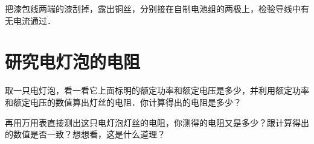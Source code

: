 把漆包线两端的漆刮掉，露出铜丝，分别接在自制电池组的两极上，检验导线中有无电流通过．

\section{研究电灯泡的电阻}
取一只电灯泡，看一看它上面标明的额定功率和额定电压是多少，并利用额定功率和额定电压的数值算出灯丝的电阻．你计算得出的电阻是多少？

再用万用表直接测出这只电灯泡灯丝的电阻，你测得的电阻又是多少？跟计算得出的数值是否一致？想想看，这是什么道理？


































